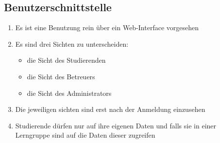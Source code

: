 \documentclass[parskip=full]{scrartcl}
\begin{document}

\subsection{Benutzerschnittstelle}
\begin{enumerate}
  \item Es ist eine Benutzung rein über ein Web-Interface vorgesehen
  \item Es sind drei Sichten zu unterscheiden:
        \begin{itemize}
          \item die Sicht des Studierenden
          \item die Sicht des Betreuers
          \item die Sicht des Administrators
        \end{itemize}
  \item Die jeweiligen sichten sind erst nach der Anmeldung einzusehen 
  \item Studierende dürfen nur auf ihre eigenen Daten und falls sie in einer
  Lerngruppe sind auf die Daten dieser zugreifen

\end{enumerate}
\end{document}
